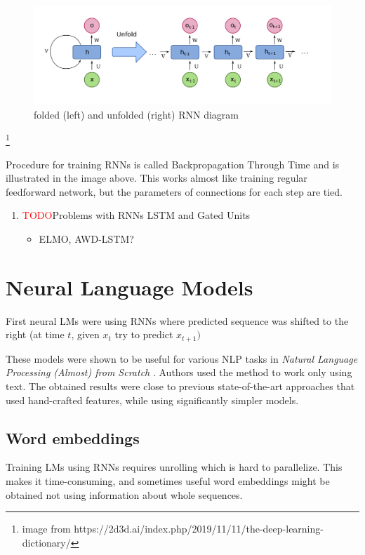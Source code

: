 \documentclass[longabstract,mgr,english]{iithesis}
\newcommand{\TODO}{\textcolor{red}{\huge{TODO}}}
\begin{document}
\begin{figure}[htbp]
\centering
\includegraphics[width=.9\linewidth]{./img/RNN.png}
\caption{folded (left) and unfolded (right) RNN diagram}
\end{figure}
\footnote{image from https://2d3d.ai/index.php/2019/11/11/the-deep-learning-dictionary/} 



Procedure for training RNNs is called Backpropagation Through Time and is illustrated in the image above.
This works almost like training regular feedforward network, but the parameters of connections for each step are tied.

\begin{enumerate}
\item\relax \TODO Problems with RNNs LSTM and Gated Units


\begin{itemize}
\item ELMO, AWD-LSTM?
\end{itemize}
\end{enumerate}

\section{Neural Language Models}

First neural LMs were using RNNs where predicted sequence was shifted to the right (at time \(t\), given \(x_t\) try to predict \(x_{t+1})\)

These models were shown to be useful for various NLP tasks in \emph{Natural Language Processing (Almost) from Scratch} \cite{nlp_scratch} .
Authors used the method to work only using text.
The obtained results were close to previous state-of-the-art approaches that used hand-crafted features,
while using significantly simpler models.

\subsection{Word embeddings}

Training LMs using RNNs requires unrolling which is hard to parallelize.
This makes it time-consuming, and sometimes useful word embeddings might be obtained not using information about whole sequences.
\end{document}

